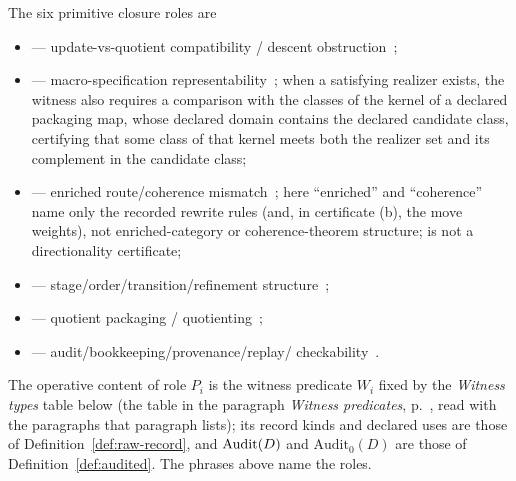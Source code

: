 \begin{definition}\label{def:primitive-roles}
The six primitive closure roles are
\begin{itemize}[topsep=2pt,itemsep=1pt]
  \item \Pone{} --- update-vs-quotient compatibility / descent
    obstruction~\citep{GrothendieckSGA1,JanelidzeTholen1994};
  \item \Ptwo{} --- macro-specification
    representability~\citep{MacLane1998}; when a satisfying realizer exists,
    the witness also requires a comparison with the classes of the kernel of
    a declared packaging map, whose declared domain contains the declared
    candidate class, certifying that some class of that kernel meets both
    the realizer set and its complement in the candidate class;
  \item \Pthree{} --- enriched route/coherence
    mismatch~\citep{BaaderNipkow1998,Nakahara2003}; here ``enriched'' and
    ``coherence'' name only the recorded rewrite rules (and, in certificate
    (b), the move weights), not enriched-category or coherence-theorem
    structure; \Pthree{} is not a directionality certificate;
  \item \Pfour{} --- stage/order/transition/refinement
    structure~\citep{Milner1989,BackVonWright1998};
  \item \Pfive{} --- quotient packaging /
    quotienting~\citep{KemenySnell1960};
  \item \Psix{} --- audit/bookkeeping/provenance/replay/%
    checkability~\citep{GreenKarvounarakisTannen2007,Merkle1987}.
\end{itemize}
The operative content of role \(P_i\) is the witness predicate \(W_i\) fixed by
the \emph{Witness types} table below (the table in the paragraph \emph{Witness predicates},
p.~\pageref{tab:witness-types}, read with the paragraphs that paragraph lists); its record kinds and declared uses are those
of Definition~\ref{def:raw-record}, and \(\operatorname{Audit}\!\left(D\right)\) and \(\mathrm{Audit}_0(D)\)
are those of Definition~\ref{def:audited}. The phrases above name the roles.
\end{definition}

